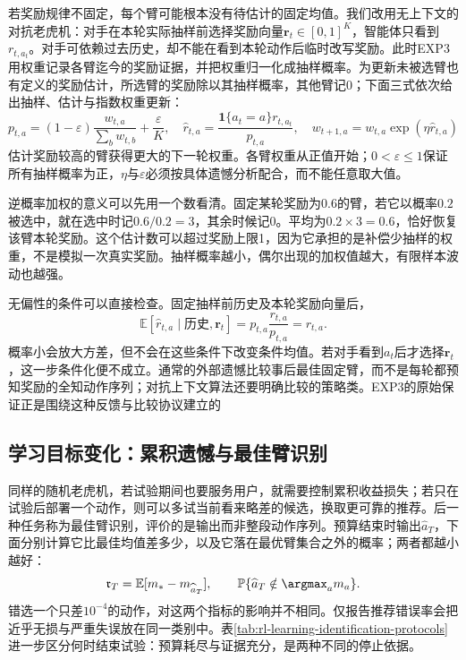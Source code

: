 若奖励规律不固定，每个臂可能根本没有待估计的固定均值。我们改用无上下文的对抗老虎机：对手在本轮实际抽样前选择奖励向量$\bm{r}_t\in[0,1]^K$，智能体只看到$r_{t,a_t}$。对手可依赖过去历史，却不能在看到本轮动作后临时改写奖励。此时EXP3用权重记录各臂迄今的奖励证据，并把权重归一化成抽样概率。为更新未被选臂也有定义的奖励估计，所选臂的奖励除以其抽样概率，其他臂记0；下面三式依次给出抽样、估计与指数权重更新：
\begin{equation}
  p_{t,a}=(1-\varepsilon)\frac{w_{t,a}}{\sum_b w_{t,b}}
                 +\frac{\varepsilon}{K},\quad
  \widehat r_{t,a}=\frac{\mathbf 1\{a_t=a\}r_{t,a_t}}{p_{t,a}},
  \quad
  w_{t+1,a}=w_{t,a}\exp(\eta\widehat r_{t,a})
  \label{eq:rl-learning-exp3}
\end{equation}
估计奖励较高的臂获得更大的下一轮权重。各臂权重从正值开始；$0<\varepsilon\leq1$保证所有抽样概率为正，$\eta$与$\varepsilon$必须按具体遗憾分析配合，而不能任意取大值。

逆概率加权的意义可以先用一个数看清。固定某轮奖励为$0.6$的臂，若它以概率$0.2$被选中，就在选中时记$0.6/0.2=3$，其余时候记0。平均为$0.2\times3=0.6$，恰好恢复该臂本轮奖励。这个估计数可以超过奖励上限1，因为它承担的是补偿少抽样的权重，不是模拟一次真实奖励。抽样概率越小，偶尔出现的加权值越大，有限样本波动也越强。

无偏性的条件可以直接检查。固定抽样前历史及本轮奖励向量后，
\[
  \mathbb E[\widehat r_{t,a}\mid\text{历史},\bm{r}_t]
  =p_{t,a}\frac{r_{t,a}}{p_{t,a}}=r_{t,a}.
\]
概率小会放大方差，但不会在这些条件下改变条件均值。若对手看到$a_t$后才选择$\bm{r}_t$，这一步条件化便不成立。通常的外部遗憾比较事后最佳固定臂，而不是每轮都预知奖励的全知动作序列；对抗上下文算法还要明确比较的策略类。EXP3的原始保证正是围绕这种反馈与比较协议建立的

\subsection{学习目标变化：累积遗憾与最佳臂识别}
\label{sec:rl-learning-best-arm}

同样的随机老虎机，若试验期间也要服务用户，就需要控制累积收益损失；若只在试验后部署一个动作，则可以多试当前看来略差的候选，换取更可靠的推荐。后一种任务称为最佳臂识别，评价的是输出而非整段动作序列。预算结束时输出$\widehat a_T$，下面分别计算它比最佳均值差多少，以及它落在最优臂集合之外的概率；两者都越小越好：
\begin{equation}
  \mathfrak r_T=\mathbb E[m_*-m_{\widehat a_T}],
  \qquad
  \mathbb P\{\widehat a_T\notin\argmax_a m_a\}.
  \label{eq:rl-learning-simple-regret}
\end{equation}
错选一个只差$10^{-4}$的动作，对这两个指标的影响并不相同。仅报告推荐错误率会把近乎无损与严重失误放在同一类别中。表\ref{tab:rl-learning-identification-protocols}进一步区分何时结束试验：预算耗尽与证据充分，是两种不同的停止依据。

